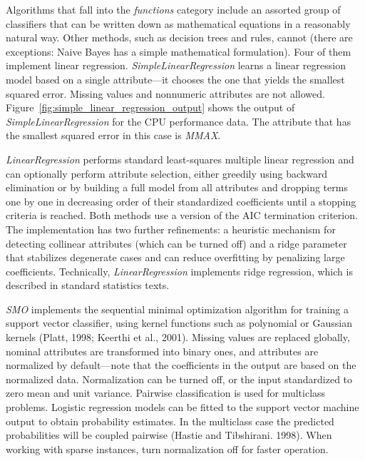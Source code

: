 Algorithms that fall into the \textit{functions} category include an
assorted group of classifiers that can be written down as mathematical
equations in a reasonably natural way. Other methods, such as decision
trees and rules, cannot (there are exceptions: Naive Bayes has a
simple mathematical formulation). Four of them implement linear
regression. \textit{SimpleLinearRegression} learns a linear regression
model based on a single attribute---it chooses the one that yields the
smallest squared error. Missing values and nonnumeric attributes are
not allowed. Figure~\ref{fig:simple_linear_regression_output} shows
the output of \textit{SimpleLinearRegression} for the CPU performance
data. The attribute that has the smallest squared error in this case
is \textit{MMAX}.

\textit{LinearRegression} performs standard least-squares multiple
linear regression and can optionally perform attribute selection,
either greedily using backward elimination or by building a full model
from all attributes and dropping terms one by one in decreasing order
of their standardized coefficients until a stopping criteria is
reached. Both methods use a version of the AIC termination
criterion. The implementation has two further refinements: a heuristic
mechanism for detecting collinear attributes (which can be turned off)
and a ridge parameter that stabilizes degenerate cases and can reduce
overfitting by penalizing large coefficients. Technically,
\textit{LinearRegression} implements ridge regression, which is
described in standard statistics texts.

\textit{SMO} implements the sequential minimal optimization algorithm for
training a support vector classifier, using kernel
functions such as polynomial or Gaussian kernels (Platt, 1998; Keerthi
et al., 2001). Missing values are replaced globally, nominal
attributes are transformed into binary ones, and attributes are
normalized by default---note that the coefficients in the output are
based on the normalized data. Normalization can be turned off, or the
input standardized to zero mean and unit variance. Pairwise
classification is used for multiclass problems. Logistic regression
models can be fitted to the support vector machine output to obtain
probability estimates. In the multiclass case the predicted
probabilities will be coupled pairwise (Hastie and
Tibshirani. 1998). When working with sparse instances, turn
normalization off for faster operation.

